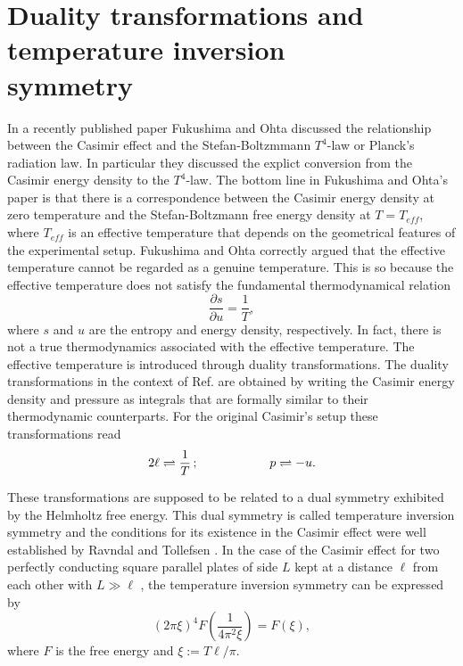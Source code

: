 \documentclass[a4paper,12pt]{article}
\begin{document}
\section{Duality transformations and temperature inversion \\ symmetry}
%
In a recently published paper Fukushima and Ohta  \cite{Fukushima&Ohta2001} discussed the relationship between the Casimir effect \cite{Casimir48} and the Stefan-Boltzmmann $T^4$-law or Planck's radiation law. In particular they discussed the explict conversion from the Casimir energy density to the $T^4$-law. The bottom line in Fukushima and Ohta's paper is that there is a correspondence between the Casimir energy density at zero temperature and the Stefan-Boltzmann free energy density at $T=T_{eff}$, where $T_{eff}$ is an effective temperature that depends on the geometrical features of the experimental setup. Fukushima and Ohta correctly argued that the effective temperature cannot be regarded as a genuine temperature. This is so because the effective temperature does not satisfy the fundamental thermodynamical relation
%
\begin{equation}\label{trueT}
\frac{\partial s}{\partial u}=\frac{1}{T},
\end{equation}
%
where $s$ and $u$ are the entropy and energy density, respectively. In fact, there is not a true thermodynamics associated with the effective temperature. The effective temperature is introduced through duality transformations. The duality transformations in the context of Ref. \cite{Fukushima&Ohta2001} are obtained by writing the Casimir energy density and pressure as integrals that are formally similar to their thermodynamic counterparts. For the original Casimir's setup these transformations read 
%
\begin{equation}\label{dualCasimir}
2\ell \rightleftharpoons \frac{1}{T}\,; \hskip 2cm p\rightleftharpoons -u.
\end{equation}

These transformations are supposed to be related to a dual symmetry exhibited by the Helmholtz free energy. This dual symmetry is called temperature inversion symmetry and the conditions for its existence in the Casimir effect were well established by Ravndal and Tollefsen \cite{Ravndal&Tollefsen89}. In the case of the Casimir effect for two perfectly conducting square parallel plates of side $L$ kept at a distance $\ell$ from each other with $L\gg \ell$ \cite{Casimir48}, the temperature inversion symmetry can be expressed by \cite{Brown&Maclay69}
%
\begin{equation}\label{TIS1}
\left(2\pi\xi\right)^4F\left(\frac{1}{4\pi^2\xi}\right)=F
\left(\xi\right),
\end{equation}  
%
where $F$ is the free energy and $\xi:=T\ell/\pi$. 
\end{document}
